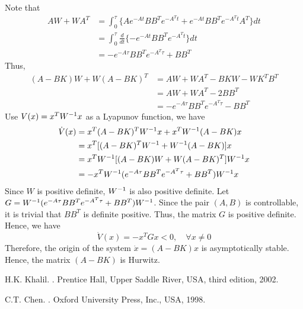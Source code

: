 \documentclass[a4 paper, 12pt]{article}
\begin{document}
Note that 
\begin{equation}
        \begin{aligned}
                AW+WA^T &= \int_0^\tau \{Ae^{-At}BB^Te^{-A^Tt} + e^{-At}BB^Te^{-A^Tt}A^T\}dt    \\
                &= \int_0^\tau \frac{d}{dt}\{-e^{-At}BB^Te^{-A^Tt}\}dt        \\
                &= -e^{-A\tau}BB^Te^{-A^T\tau} + BB^T
        \end{aligned}
\end{equation}
Thus,
\begin{equation}
        \begin{aligned}
                (A-BK)W + W(A-BK)^T &= AW+WA^T - BKW - WK^TB^T  \\
                &= AW+WA^T - 2BB^T      \\
                &= -e^{-A\tau}BB^Te^{-A^T\tau} - BB^T
        \end{aligned}
\end{equation}
Use $V(x) = x^TW^{-1}x$ as a Lyapunov function, we have
\begin{equation}\label{eq:dotV}
        \begin{aligned}
                \dot{V}(x) 
                &= x^T(A-BK)^TW^{-1}x + x^TW^{-1}(A-BK)x      \\
                &= x^T[(A-BK)^TW^{-1} + W^{-1}(A-BK)]x        \\
                &= x^TW^{-1}[(A-BK)W + W(A-BK)^T]W^{-1}x      \\
                &= -x^TW^{-1}(e^{-A\tau}BB^Te^{-A^T\tau} + BB^T)W^{-1}x
        \end{aligned}
\end{equation}
Since $W$ is positive definite, $W^{-1}$ is also positive definite. Let $G=W^{-1}(e^{-A\tau}BB^Te^{-A^T\tau} + BB^T)W^{-1}$. Since the pair $(A,B)$ is controllable, it is trivial that $BB^T$ is definite positive. Thus, the matrix $G$ is positive definite. Hence, we have 
\begin{equation}
        \dot{V}(x) = -x^TGx < 0, \quad \forall x \neq 0
\end{equation}
Therefore, the origin of the system $\dot{x}=(A-BK)x$ is asymptotically stable. Hence, the matrix $(A-BK)$ is Hurwitz.


\begin{thebibliography}{99}

         H.K. Khalil. . Prentice Hall, Upper Saddle River, USA, third edition, 2002.

         C.T. Chen. . Oxford University Press, Inc., USA, 1998.

    
\end{thebibliography}
\end{document}
